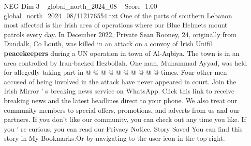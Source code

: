 \begin{textsample}{NEG Dim 3 – global\_north\_2024\_08 – Score -1.00 – global\_north\_2024\_08/112176554.txt}
One of the parts of southern Lebanon most affected is the Irish area of operations where our Blue Helmets mount patrols every day.
In December 2022, Private Sean Rooney, 24, originally from Dundalk, Co Louth, was killed in an attack on a convoy of Irish Unifil \textbf{peacekeepers} during a UN operation in town of Al-Aqbiya.
The town is in an area controlled by Iran-backed Hezbollah.
One man, Muhammad Ayyad, was held for allegedly taking part in @ @ @ @ @ @ @ @ @ @ times.
Four other men accused of being involved in the attack have never appeared in court.
Join the Irish Mirror ' s breaking news service on WhatsApp.
Click this link to receive breaking news and the latest headlines direct to your phone.
We also treat our community members to special offers, promotions, and adverts from us and our partners.
If you don't like our community, you can check out any time you like.
If you ' re curious, you can read our Privacy Notice.
Story Saved You can find this story in My Bookmarks.Or by navigating to the user icon in the top right.

\end{textsample}
